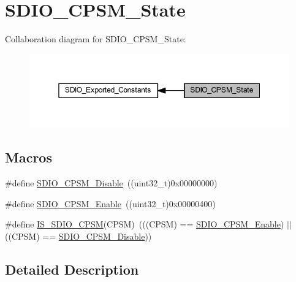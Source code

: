 \hypertarget{group___s_d_i_o___c_p_s_m___state}{}\section{S\+D\+I\+O\+\_\+\+C\+P\+S\+M\+\_\+\+State}
\label{group___s_d_i_o___c_p_s_m___state}
Collaboration diagram for S\+D\+I\+O\+\_\+\+C\+P\+S\+M\+\_\+\+State\+:
\nopagebreak
\begin{figure}[H]
\begin{center}
\leavevmode
\includegraphics[width=350pt]{group___s_d_i_o___c_p_s_m___state}
\end{center}
\end{figure}
\subsection*{Macros}
\begin{DoxyCompactItemize}
\item 
\#define \hyperlink{group___s_d_i_o___c_p_s_m___state_ga996751273ad238e255a740f7c2844c6c}{S\+D\+I\+O\+\_\+\+C\+P\+S\+M\+\_\+\+Disable}~((uint32\+\_\+t)0x00000000)
\item 
\#define \hyperlink{group___s_d_i_o___c_p_s_m___state_gad437cefe89d6175aa074a1c40b909ebc}{S\+D\+I\+O\+\_\+\+C\+P\+S\+M\+\_\+\+Enable}~((uint32\+\_\+t)0x00000400)
\item 
\#define \hyperlink{group___s_d_i_o___c_p_s_m___state_ga58cf04903dab015106e4e0937bef443b}{I\+S\+\_\+\+S\+D\+I\+O\+\_\+\+C\+P\+SM}(C\+P\+SM)~(((C\+P\+SM) == \hyperlink{group___s_d_i_o___c_p_s_m___state_gad437cefe89d6175aa074a1c40b909ebc}{S\+D\+I\+O\+\_\+\+C\+P\+S\+M\+\_\+\+Enable}) $\vert$$\vert$ ((C\+P\+SM) == \hyperlink{group___s_d_i_o___c_p_s_m___state_ga996751273ad238e255a740f7c2844c6c}{S\+D\+I\+O\+\_\+\+C\+P\+S\+M\+\_\+\+Disable}))
\end{DoxyCompactItemize}


\subsection{Detailed Description}



